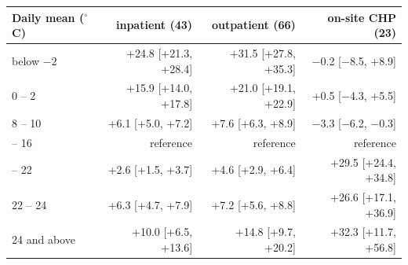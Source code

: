 \begin{tabular}{lrrr}
\toprule
Daily mean ($^\circ$C) & inpatient (43) & outpatient (66) & on-site CHP (23) \\
\midrule
below $-2$ & +24.8 [+21.3, +28.4] & +31.5 [+27.8, +35.3] & $-$0.2 [$-$8.5, +8.9] \\
0 -- 2 & +15.9 [+14.0, +17.8] & +21.0 [+19.1, +22.9] & +0.5 [$-$4.3, +5.5] \\
8 -- 10 & +6.1 [+5.0, +7.2] & +7.6 [+6.3, +8.9] & $-$3.3 [$-$6.2, $-$0.3] \\
\addlinespace[3pt]
14 -- 16 & reference & reference & reference \\
\addlinespace[3pt]
20 -- 22 & +2.6 [+1.5, +3.7] & +4.6 [+2.9, +6.4] & +29.5 [+24.4, +34.8] \\
22 -- 24 & +6.3 [+4.7, +7.9] & +7.2 [+5.6, +8.8] & +26.6 [+17.1, +36.9] \\
24 and above & +10.0 [+6.5, +13.6] & +14.8 [+9.7, +20.2] & +32.3 [+11.7, +56.8] \\
\bottomrule
\end{tabular}

